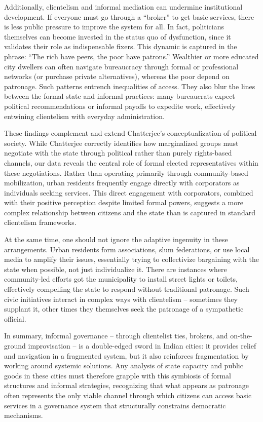 Additionally, clientelism and informal mediation can undermine institutional development. If everyone must go through a ``broker'' to get basic services, there is less public pressure to improve the system for all. In fact, politicians themselves can become invested in the status quo of dysfunction, since it validates their role as indispensable fixers. This dynamic is captured in the phrase: ``The rich have peers, the poor have patrons.'' Wealthier or more educated city dwellers can often navigate bureaucracy through formal or professional networks (or purchase private alternatives), whereas the poor depend on patronage. Such patterns entrench inequalities of access. They also blur the lines between the formal state and informal practices: many bureaucrats expect political recommendations or informal payoffs to expedite work, effectively entwining clientelism with everyday administration.

These findings complement and extend Chatterjee's conceptualization of political society. While Chatterjee correctly identifies how marginalized groups must negotiate with the state through political rather than purely rights-based channels, our data reveals the central role of formal elected representatives within these negotiations. Rather than operating primarily through community-based mobilization, urban residents frequently engage directly with corporators as individuals seeking services. This direct engagement with corporators, combined with their positive perception despite limited formal powers, suggests a more complex relationship between citizens and the state than is captured in standard clientelism frameworks.

At the same time, one should not ignore the adaptive ingenuity in these arrangements. Urban residents form associations, slum federations, or use local media to amplify their issues, essentially trying to collectivize bargaining with the state when possible, not just individualize it. There are instances where community-led efforts got the municipality to install street lights or toilets, effectively compelling the state to respond without traditional patronage. Such civic initiatives interact in complex ways with clientelism – sometimes they supplant it, other times they themselves seek the patronage of a sympathetic official.

In summary, informal governance – through clientelist ties, brokers, and on-the-ground improvisation – is a double-edged sword in Indian cities: it provides relief and navigation in a fragmented system, but it also reinforces fragmentation by working around systemic solutions. Any analysis of state capacity and public goods in these cities must therefore grapple with this symbiosis of formal structures and informal strategies, recognizing that what appears as patronage often represents the only viable channel through which citizens can access basic services in a governance system that structurally constrains democratic mechanisms.

